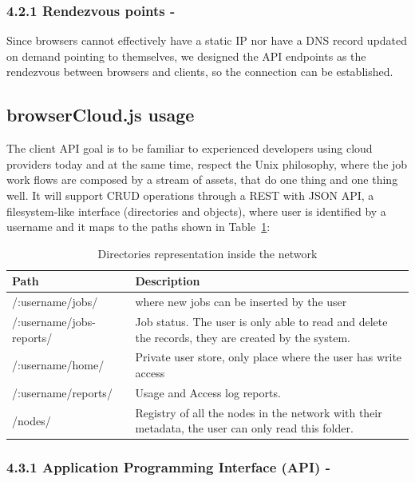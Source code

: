 \subsubsection{4.2.1 Rendezvous points -}

Since browsers cannot effectively have a static IP nor have a DNS record updated on demand pointing to themselves, we designed the API endpoints as the rendezvous between browsers and clients, so the connection can be established.

\subsection{browserCloud.js usage}

The client API goal is to be familiar to experienced developers using cloud providers today and at the same time, respect the Unix philosophy, where the job work flows are composed by a stream of assets, that do one thing and one thing well. It will support CRUD operations through a REST with JSON API, a filesystem-like interface (directories and objects), where user is identified by a username and it maps to the paths shown in Table~\ref{tbl:dirrepnet}: 

\begin{table}
  \centering
  \begin{tabular}{ p{3cm} | p{12cm} }
  Path & Description \\
  \hline 
  /:username/jobs/ & where new jobs can be inserted by the user \\
  \hline
  /:username/jobs-reports/ & Job status. The user is only able to read and delete the records, they are created by the system. \\
  \hline 
  /:username/home/ &  Private user store, only place where the user has write access \\
  \hline   
  /:username/reports/ & Usage and Access log reports. \\ 
  \hline   
  /nodes/ & Registry of all the nodes in the network with their metadata, the user can only read this folder. \\
  \end{tabular}
  \caption{Directories representation inside the network}
  \label{tbl:dirrepnet}
\end{table}

\subsubsection{4.3.1 Application Programming Interface (API) -}

